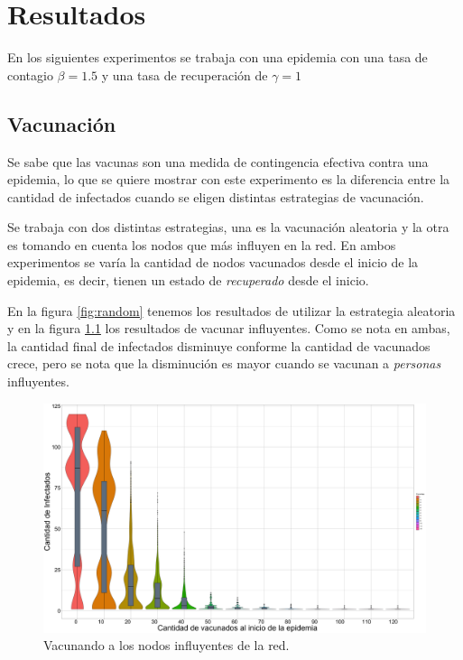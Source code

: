 \chapter{Resultados}\label{ch:results}
En los siguientes experimentos se trabaja con una epidemia con una tasa de contagio $\beta = 1.5$ y una tasa de recuperación de $\gamma = 1$
\section{Vacunación}
Se sabe que las vacunas son una medida de contingencia efectiva contra una epidemia, lo que se quiere mostrar con este experimento es la diferencia entre la cantidad de infectados cuando se eligen distintas estrategias de vacunación. 

Se trabaja con dos distintas estrategias, una es la vacunación aleatoria y la otra es tomando en cuenta los nodos que más influyen en la red. En ambos experimentos se varía la cantidad de nodos vacunados desde el inicio de la epidemia, es decir, tienen un estado de \textit{recuperado} desde el inicio. 

En la figura \ref{fig:random} tenemos los resultados de utilizar la estrategia aleatoria y en la figura \ref{fig:influential-nodes} los resultados de vacunar influyentes. Como se nota en ambas, la cantidad final de infectados disminuye conforme la cantidad de vacunados crece, pero se nota que la disminución es mayor cuando se vacunan a \textit{personas} influyentes.

\begin{figure}
    \centering
    \includegraphics[scale=0.18]{Tesis/img/influential-nodes.png}
    \caption{Vacunando a los nodos influyentes de la red.}
    \label{fig:influential-nodes}
\end{figure}

